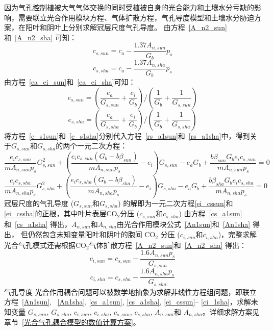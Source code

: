 因为气孔控制植被大气气体交换的同时受植被自身的光合能力和土壤水分亏缺的影响，需要联立光合作用模块方程、气体扩散方程，气孔导度模型和土壤水分胁迫方案，在阳叶和阴叶上分别求解冠层尺度气孔导度。
由方程~\eqref{A_n2_sun}和~\eqref{A_n2_sha} 可知：
\begin{equation}\label{cs_a1sun}
c_{s,sun}=c_{a}-\frac{1.37 A_{n,sun}}{G_{b}} p_{s}
\end{equation}
\begin{equation}\label{cs_a1sha}
c_{s,sha}=c_{a}-\frac{1.37 A_{n,sha}}{G_{b}} p_{s}
\end{equation}
由方程~\eqref{ea_ei_sun}和~\eqref{ea_ei_sha}可知：
\begin{equation}\label{e_s1sun}
e_{s,sun}=\left(\frac{e_{a}}{G_{s,sun}}+\frac{e_{i}}{G_{b}}\right) /\left(\frac{1}{G_{b}}+\frac{1}{G_{s,sun}}\right)
\end{equation}
\begin{equation}\label{e_s1sha}
e_{s,sha}=\left(\frac{e_{a}}{G_{s,sha}}+\frac{e_{i}}{G_{b}}\right) /\left(\frac{1}{G_{b}}+\frac{1}{G_{s,sha}}\right)
\end{equation}
将方程~\eqref{e_s1sun}和~\eqref{e_s1sha}分别代入方程~\eqref{rs_a1sun}和~\eqref{rs_a1sha}中，得到关于$G_{s,sun}$和$G_{s,sha}$的两个一元二次方程：
\begin{equation}\label{ei_cssun}
\frac{e_{i} c_{s,sun}}{m A_{n,sun} p_{s}} G_{s,sun}^{2}+\left(\frac{e_{i} c_{s,sun}\left(G_{b} -b \beta_{sun}\right)}{m A_{n,sun} p_{s}}-e_{i}\right) G_{s,sun}
-e_{a} G_{b}+\frac{b \beta_{sun} G_{b} e_{i} c_{s,sun}}{m A_{n,sun} p_{s}}=0
\end{equation}
\begin{equation}\label{ei_cssha}
\frac{e_{i} c_{s,sha}}{m A_{n,sha} p_{s}} G_{s,sha}^{2}+\left(\frac{e_{i} c_{s,sha}\left(G_{b} -b \beta_{sha}\right)}{m A_{n,sha} p_{s}}-e_{i}\right) G_{s,sha}
-e_{a} G_{b}+\frac{b \beta_{sha} G_{b} e_{i} c_{s,sha}}{m A_{n,sha} p_{s}}=0
\end{equation}
冠层尺度的气孔导度 ($G_{s,sun}$和$G_{s,sha}$) 的解即为一元二次方程\eqref{ei_cssun}和\eqref{ei_cssha}的正根，其中叶片表层$\mathrm{CO_2}$分压 ($c_{s,sun}$和$c_{s,sha}$) 由方程~\eqref{cs_a1sun}和~\eqref{cs_a1sha} 得出，$A_{n,sun}$和$A_{n,sha}$由光合作用模块公式~\eqref{An1sun}和~\eqref{An1sha} 得出，
但仍然包含未知变量阳叶和阴叶的胞间 $\mathrm{CO_2}$ 分压 ($c_{i,sun}$和$c_{i,sha}$)，完整求解光合气孔模式还需根据$\mathrm{CO_2}$气体扩散方程~\eqref{A_n2_sun}和~\eqref{A_n2_sha} 得出：
\begin{equation}\label{ci_1sun}
c_{i,sun}=c_{s,sun}-\frac{1.6 A_{n,sun} p_{s}}{G_{s,sun}}
\end{equation}
\begin{equation}\label{ci_1sha}
c_{i,sha}=c_{s,sha}-\frac{1.6 A_{n,sha} p_{s}}{G_{s,sha}}
\end{equation}
气孔导度-光合作用耦合问题可以被数学地抽象为求解非线性方程组问题，即联立方程~\eqref{An1sun}, ~\eqref{An1sha}, \eqref{cs_a1sun}, \eqref{cs_a1sha}, \eqref{ei_cssun}--%
\eqref{ci_1sha}，求解未知变量 $G_{s,sun}$, $G_{s,sha}$, $c_{i,sun}$, $c_{i,sha}$, $c_{s,sun}$, $c_{s,sha}$, $A_{n,sun}$和 $A_{n,sha}$。详细求解方案见章节~\ref{光合气孔耦合模型的数值计算方案}。


